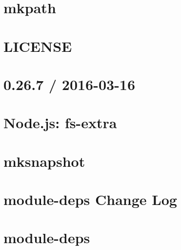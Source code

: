 \documentclass[twoside]{book}
\newcommand{\+}{\discretionary{\mbox{\scriptsize$\hookleftarrow$}}{}{}}
\begin{document}
\chapter{mkpath}
\label{md_dsmacc_examples_DRmerge_node_modules_mkpath_README}

\chapter{L\+I\+C\+E\+N\+SE}
\label{md_dsmacc_examples_DRmerge_node_modules_mksnapshot_LICENSE}

\chapter{0.26.7 / 2016-\/03-\/16}
\label{md_dsmacc_examples_DRmerge_node_modules_mksnapshot_node_modules_fs-extra_CHANGELOG}

\chapter{Node.\+js\+: fs-\/extra}
\label{md_dsmacc_examples_DRmerge_node_modules_mksnapshot_node_modules_fs-extra_README}

\chapter{mksnapshot}
\label{md_dsmacc_examples_DRmerge_node_modules_mksnapshot_README}

\chapter{module-\/deps Change Log}
\label{md_dsmacc_examples_DRmerge_node_modules_module-deps_CHANGELOG}

\chapter{module-\/deps}
\label{md_dsmacc_examples_DRmerge_node_modules_module-deps_readme}

\end{document}

